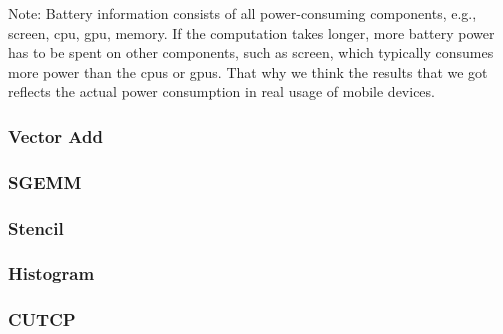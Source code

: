 Note: Battery information consists of all power-consuming components, e.g., screen,
cpu, gpu, memory. If the computation takes longer, more battery power has to
be spent on other components, such as screen, which typically consumes more
power than the cpus or gpus. That why we think the results that we got
reflects the actual power consumption in real usage of mobile devices.

\subsubsection{Vector Add}

\subsubsection{SGEMM}

\subsubsection{Stencil}

\subsubsection{Histogram}

\subsubsection{CUTCP}
